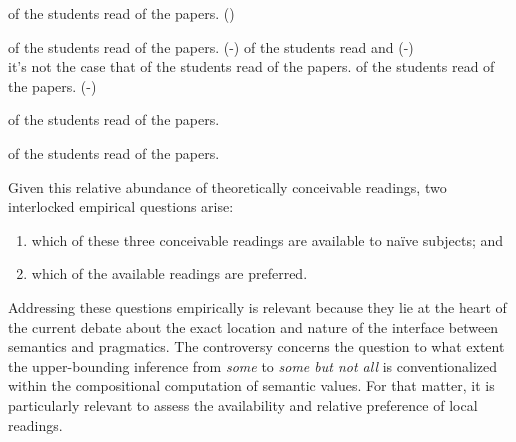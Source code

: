 \documentclass[fleqn,reqno,10pt,draft]{article}
\newcommand{\lit}{\acro{lit}}
\newcommand{\glb}{\acro{glb}}
\newcommand{\loc}{\acro{loc}}
\renewcommand{\es}{\acro{es}}
\begin{document}
\begin{exe}
\ex  \label{bsp:GE}  of the students read {} of the
  papers. \hfill{(\es)}

  \begin{xlist}
  \ex \label{bsp:GE-Literal}  of the students read
    {} of the papers. \hfill (\es-\lit)
  \ex \label{bsp:GE-Global}
     of the students read  
    and  \hfill (\es-\glb)\\
    it's not the case that  of the students read  of the papers.
  \ex \label{bsp:GE-Local}
     of the students read {} of the
    papers. \hfill (\es-\loc)
  \end{xlist}
\end{exe}


\begin{exe}
\ex \label{bsp:AE-Alternative}  of the students read
  {} of the papers. 

\ex \label{bsp:GE-Alternative}  of the students
  read {} of the papers.
\end{exe}


\noindent Given this relative abundance of theoretically conceivable
readings, two interlocked empirical questions arise:
\begin{enumerate}[Q1:]
\item which of these three
conceivable readings are available to na\"{i}ve subjects; and
\item which of the available readings are preferred.
\end{enumerate}
Addressing these questions empirically is relevant because they lie at
the heart of the current debate about the exact location and nature of
the interface between semantics and pragmatics. The controversy
concerns the question to what extent the upper-bounding inference from
\emph{some} to \emph{some but not all} is conventionalized within the
compositional computation of semantic values. For that matter, it is
particularly relevant to assess the availability and relative
preference of local readings. %
\end{document}
